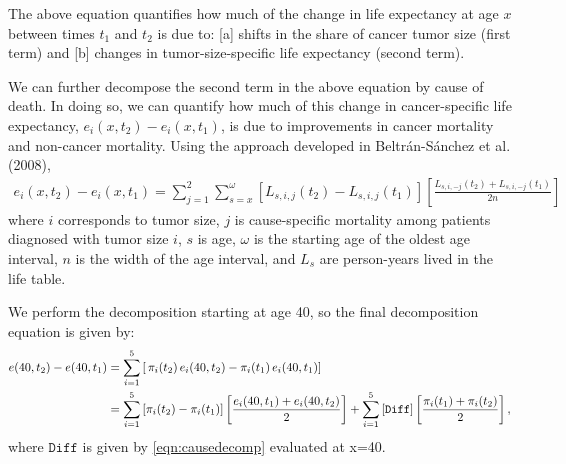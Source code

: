 \documentclass[12pt,letterpaper]{article}
\theoremstyle{plain}
\begin{document}
The above equation quantifies how much of the change in life
expectancy at age $x$ between times $t_1$ and $t_2$ is due to: [a]
shifts in the share of cancer tumor size (first term) and [b] changes
in tumor-size-specific life expectancy (second term).

We can further decompose the second term in the above equation by
cause of death. In doing so, we can quantify how much of this change
in cancer-specific life expectancy, $e_i(x,t_2)-e_i(x,t_1)$, is due to
improvements in cancer mortality and non-cancer mortality.  Using the
approach developed in Beltr\'{a}n-S\'{a}nchez et al. (2008),
\begin{eqnarray}
e_i(x,t_2)-e_i(x,t_1)=\sum_{j=1}^{2} \sum_{s=x}^{\omega}\left[L_{s,i,j}(t_2)-L_{s,i,j}(t_1) \right] \left[\frac{L_{s,i,-j}(t_2)+L_{s,i,-j}(t_1) }{2n} \right]
\label{eqn:causedecomp}
\end{eqnarray}
where $i$ corresponds to tumor size, $j$ is cause-specific mortality
among patients diagnosed with tumor size $i$, $s$ is age, $\omega$ is
the starting age of the oldest age interval, $n$ is the width of the age
interval, and $L_s$ are person-years lived in the life table.

We perform the decomposition starting at age 40, so the final
decomposition equation is given by:
\begin{align*}
  e(40,t_2)-e(40,t_1)&=\sum_{i=1}^{5}\left[\,\pi_i(t_2)\,e_i(40,t_2)- \pi_i(t_1)\,e_i(40,t_1)\right] \notag \\
  &=\sum_{i=1}^{5}\left[\pi_i(t_2)-\pi_i(t_1) \right]\left[\frac{e_i(40,t_1)+e_i(40,t_2)}{2}\right]+\sum_{i=1}^{5}\left[\mathtt{Diff} \right]\left[\frac{\pi_i(t_1)+\pi_i(t_2)}{2}\right],
\end{align*}
where $\mathtt{Diff}$ is given by \eqref{eqn:causedecomp} evaluated at x=40.\\
\end{document}
